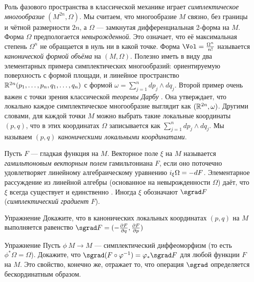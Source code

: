 Роль фазового пространства в классической механике играет \emph{симплектическое многообразие} $(M^{2n},\Omega)$.
Мы считаем, что многообразие $M$ связно, без границы и чётной размерности $2n$, а $\Omega$ — замкнутая дифференциальная 2-форма на $M$.
Форма $\Omega$ предпологается {}\emph{невырожденной}.
Это означает, что её максимальная степень $\Omega^n$ не обращается в нуль ни в какой точке.
Форма $\Vol =  \tfrac{\Omega^n}{n!}$ называется \emph{канонической формой объёма} на $(M, \Omega)$.
Полезно иметь в виду два элементарных примера симплектических многообразий:
ориентируемую поверхность с формой площади, и линейное пространство $\RR^{2n} (p_1,\z\dots, p_n, q_1,\z\dots, q_n)$ с формой $\omega = \sum^n_{j = 1} dp_j \wedge dq_j$.
Второй пример очень важен с точки зрения классической \emph{теоремы Дарбу} \cite{MS}.
Она утверждает, что локально каждое симплектическое многообразие выглядит как $(\mathbb{R}^{2n}, \omega)$.
Другими словами, для каждой точки $M$ можно выбрать такие локальные координаты $(p, q)$, что в этих координатах $\Omega$ записывается как $\sum^n_{j = 1} dp_j \wedge dq_j$.
Мы называем $(p, q)$ \emph{каноническими локальными координатами}.

Пусть $F$ — гладкая функция на $M$.
Векторное поле $\xi$ на $M$ называется \emph{гамильтоновым векторным полем} гамильтониана $F$, если оно поточечно удовлетворяет линейному алгебраическому уравнению $i_\xi \Omega \z= -dF$.
Элементарное рассуждение из линейной алгебры (основанное на невырожденности $\Omega$) даёт, что $\xi$ всегда существует и единственно \cite{MS}.
Иногда $\xi$ обозначают $\sgrad F$ (\emph{симплектический градиент} $F$).

\begin{ex}{Упражнение}\label{1.3.A}
Докажите, что в канонических локальных координатах $(p, q)$ на
$M$ выполняется равенство \index[symb]{$\sgrad$} $\sgrad F = (-\tfrac{\partial F}{\partial q},\tfrac{\partial F}{\partial p})$
\end{ex}

\begin{ex}{Упражнение}\label{1.3.B}
Пусть  $\phi\: M \to M$ — симплектический диффеоморфизм
(то есть $\phi^\ast \Omega = \Omega$).
Докажите, что $\sgrad (F \circ \phi^{-1}) \z= \phi_\ast \sgrad F$ для любой функции $F$ на $M$.
Это свойство, конечно же, отражает то, что операция $\sgrad$ определяется бескординатным образом.
\end{ex}


